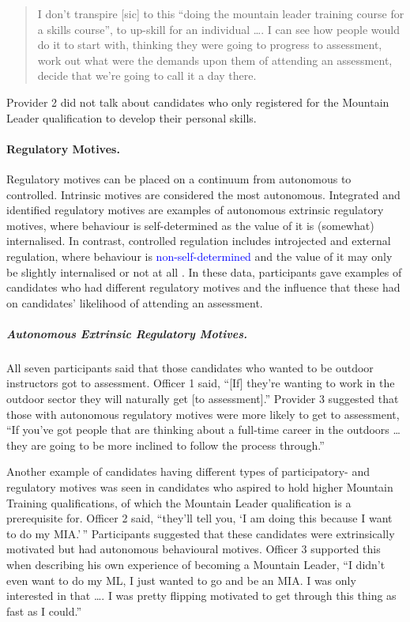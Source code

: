 \documentclass[
  12pt,
  a4paper,
]{book}
\begin{document}
\begin{quote}
I don't transpire {[}sic{]} to this ``doing the mountain leader training course for a skills course'', to up-skill for an individual \ldots. I can see how people would do it to start with, thinking they were going to progress to assessment, work out what were the demands upon them of attending an assessment, decide that we're going to call it a day there.
\end{quote}

Provider 2 did not talk about candidates who only registered for the Mountain Leader qualification to develop their personal skills.

\hypertarget{regulatory-motives.}{%
\paragraph{Regulatory Motives.}\label{regulatory-motives.}}

Regulatory motives can be placed on a continuum from autonomous to controlled. Intrinsic motives are considered the most autonomous. Integrated and identified regulatory motives are examples of autonomous extrinsic regulatory motives, where behaviour is self-determined as the value of it is (somewhat) internalised. In contrast, controlled regulation includes introjected and external regulation, where behaviour is \textcolor{blue}{non-self-determined} and the value of it may only be slightly internalised or not at all \citep{Deci2000}. In these data, participants gave examples of candidates who had different regulatory motives and the influence that these had on candidates' likelihood of attending an assessment.

\hypertarget{autonomous-extrinsic-regulatory-motives.}{%
\subparagraph{Autonomous Extrinsic Regulatory Motives.}\label{autonomous-extrinsic-regulatory-motives.}}

All seven participants said that those candidates who wanted to be outdoor instructors got to assessment. Officer 1 said, ``{[}If{]} they're wanting to work in the outdoor sector they will naturally get {[}to assessment{]}.'' Provider 3 suggested that those with autonomous regulatory motives were more likely to get to assessment, ``If you've got people that are thinking about a full-time career in the outdoors \ldots{} they are going to be more inclined to follow the process through.''

Another example of candidates having different types of participatory- and regulatory motives was seen in candidates who aspired to hold higher Mountain Training qualifications, of which the Mountain Leader qualification is a prerequisite for. Officer 2 said, ``they'll tell you, `I am doing this because I want to do my MIA.'\,'' Participants suggested that these candidates were extrinsically motivated but had autonomous behavioural motives. Officer 3 supported this when describing his own experience of becoming a Mountain Leader, ``I didn't even want to do my ML, I just wanted to go and be an MIA. I was only interested in that \ldots. I was pretty flipping motivated to get through this thing as fast as I could.''
\end{document}
